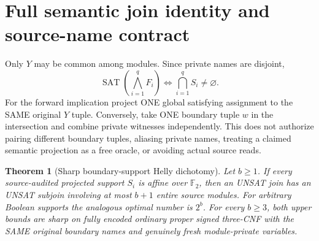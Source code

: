 \documentclass[11pt]{article}
\newtheorem{theorem}{Theorem}
\newcommand{\GF}{\mathbb F_2}
\begin{document}
\section{Full semantic join identity and source-name contract}
Only $Y$ may be common among modules. Since private names are disjoint,
\[
\boxed{\operatorname{SAT}(\bigwedge_{i=1}^{q}F_i)
\Longleftrightarrow \bigcap_{i=1}^q S_i\ne\varnothing.}\tag{J}
\]
For the forward implication project ONE global satisfying assignment to the SAME original $Y$ tuple. Conversely, take ONE boundary tuple $w$ in the intersection and combine private witnesses independently. This does not authorize pairing different boundary tuples, aliasing private names, treating a claimed semantic projection as a free oracle, or avoiding actual source reads.

\begin{theorem}[Sharp boundary-support Helly dichotomy]\label{th:helly}
Let $b\ge1$.
If every source-audited projected support $S_i$ is affine over $\GF$, then an UNSAT join has an UNSAT subjoin involving at most $b+1$ entire source modules. For arbitrary Boolean supports the analogous optimal number is $2^b$. For every $b\ge3$, both upper bounds are sharp on fully encoded ordinary proper signed three-CNF with the SAME original boundary names and genuinely fresh module-private variables.
\end{theorem}
\end{document}
